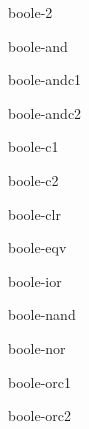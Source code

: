 \begin{constant}{boole-2}{}{}{}
  
\end{constant}

\begin{constant}{boole-and}{}{}{}
  
\end{constant}

\begin{constant}{boole-andc1}{}{}{}
  
\end{constant}

\begin{constant}{boole-andc2}{}{}{}
  
\end{constant}

\begin{constant}{boole-c1}{}{}{}
  
\end{constant}

\begin{constant}{boole-c2}{}{}{}
  
\end{constant}

\begin{constant}{boole-clr}{}{}{}
  
\end{constant}

\begin{constant}{boole-eqv}{}{}{}
  
\end{constant}

\begin{constant}{boole-ior}{}{}{}
  
\end{constant}

\begin{constant}{boole-nand}{}{}{}
  
\end{constant}

\begin{constant}{boole-nor}{}{}{}
  
\end{constant}

\begin{constant}{boole-orc1}{}{}{}
  
\end{constant}

\begin{constant}{boole-orc2}{}{}{}
  
\end{constant}

